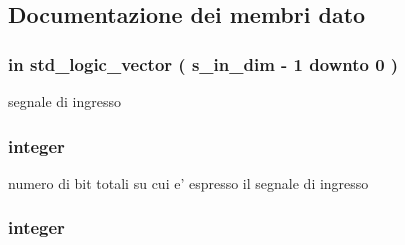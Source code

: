\subsection{Documentazione dei membri dato}
\hypertarget{classtruncate_a6d6bd3ddfff26c223f1752f25545e304}{
\subsubsection[{s\+\_\+in}]{ {\bfseries \textcolor{vhdlchar}{in}\textcolor{vhdlchar}{ }} {\bfseries \textcolor{vhdlchar}{std\+\_\+logic\+\_\+vector}\textcolor{vhdlchar}{ }\textcolor{vhdlchar}{(}\textcolor{vhdlchar}{ }\textcolor{vhdlchar}{ }\textcolor{vhdlchar}{ }\textcolor{vhdlchar}{ }{\bfseries {\bf s\+\_\+in\+\_\+dim}} \textcolor{vhdlchar}{-\/}\textcolor{vhdlchar}{ } \textcolor{vhdldigit}{1} \textcolor{vhdlchar}{ }\textcolor{vhdlchar}{downto}\textcolor{vhdlchar}{ }\textcolor{vhdlchar}{ } \textcolor{vhdldigit}{0} \textcolor{vhdlchar}{ }\textcolor{vhdlchar}{)}\textcolor{vhdlchar}{ }} \hspace{0.3cm}{\ttfamily [Port]}}}\label{classtruncate_a6d6bd3ddfff26c223f1752f25545e304}


segnale di ingresso 

\hypertarget{classtruncate_ad3d18243ad6fe53a2277e2aa9b94ca45}{
\subsubsection[{s\+\_\+in\+\_\+dim}]{ {\bfseries \textcolor{vhdlchar}{ }} {\bfseries \textcolor{vhdlchar}{integer}\textcolor{vhdlchar}{ }} \hspace{0.3cm}{\ttfamily [Generic]}}}\label{classtruncate_ad3d18243ad6fe53a2277e2aa9b94ca45}


numero di bit totali su cui e' espresso il segnale di ingresso 

\hypertarget{classtruncate_abe72b503b8140ab0d84911165e959b53}{
\subsubsection[{s\+\_\+in\+\_\+int}]{ {\bfseries \textcolor{vhdlchar}{ }} {\bfseries \textcolor{vhdlchar}{integer}\textcolor{vhdlchar}{ }} \hspace{0.3cm}{\ttfamily [Generic]}}}\label{classtruncate_abe72b503b8140ab0d84911165e959b53}



